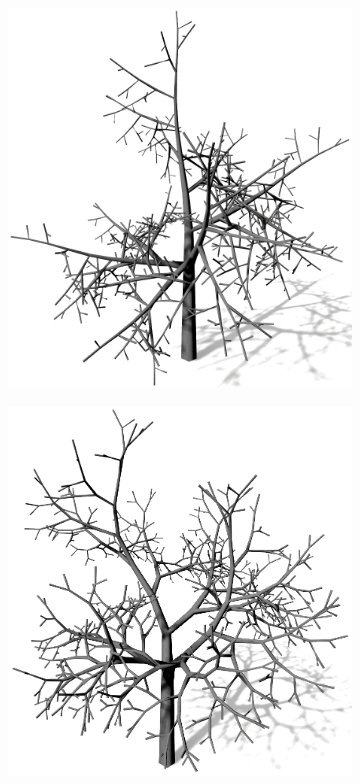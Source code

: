 \begin{figure} [hbtp]
	\centering
	\begin{subfigure}[t]{.45\textwidth}
		\centering
		\includegraphics[height=.21\textheight]{images/LS_Sympodial_1.png}
		\caption{}
		\label{subfig:LS_Sympodial_1}
	\end{subfigure}
	\begin{subfigure}[t]{.45\textwidth}
		\centering
		\includegraphics[height=.21\textheight]{images/LS_Sympodial_2.png}

\end{subfigure}
\end{figure}
